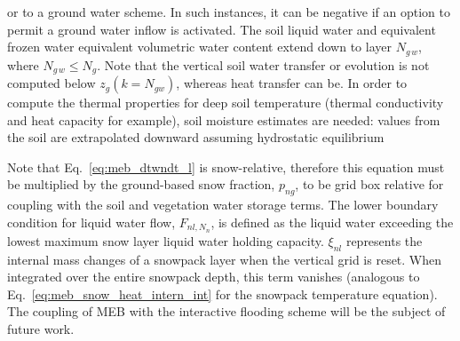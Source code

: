 {or to a ground water scheme. In such instances, it
can be negative if an option to permit a ground water inflow is
activated.
%
%
%
The soil liquid water and equivalent frozen water equivalent volumetric water
content extend down to layer $N_{g\,w}$, where $N_{g\,w} \leq N_g$. 
Note that the vertical soil water transfer or evolution is not computed 
below $z_{g}\left(k=N_{gw} \right)$, whereas heat transfer can
be. 
In order to compute the thermal properties for deep
soil temperature (thermal
conductivity and heat capacity for example), soil moisture estimates
are needed: values from the soil are extrapolated downward assuming
hydrostatic
equilibrium 
%


Note that Eq.~\ref{eq:meb_dtwndt_l} is snow-relative, therefore this equation must be
multiplied by the ground-based snow fraction, $p_{ng}$, to be grid box
relative for coupling with the soil and vegetation water storage terms.
The lower boundary condition for liquid water flow,
$F_{nl,N_n}$, is defined as the liquid water exceeding 
the lowest maximum snow layer liquid water holding capacity.
%
$\xi_{nl}$ represents the internal mass changes 
of a snowpack layer 
when the vertical grid is reset.
When integrated over the entire snowpack depth, this term
vanishes (analogous to Eq.~\ref{eq:meb_snow_heat_intern_int} for the 
snowpack temperature equation).
%
%
The coupling of MEB with the interactive flooding scheme will be the
subject of future work.


}
